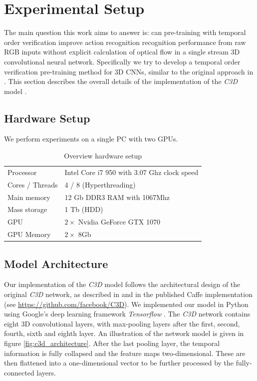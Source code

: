 \section{Experimental Setup}
The main question this work aims to answer is: can pre-training with temporal order verification improve action recognition recognition performance from raw RGB inputs without explicit calculation of optical flow in a single stream 3D convolutional neural network.
Specifically we try to develop a temporal order verification pre-training method for 3D CNNs, similar to the original approach in \cite{misra_shuffle_2016}.
This section describes the overall details of the implementation of the \textit{C3D} model \cite{tran_learning_2015}.


\subsection{Hardware Setup}
\label{sec:hardware}
We perform experiments on a single PC with two GPUs.

\begin{table}[H]
\centering
\begin{tabularx}{\textwidth}{l X}
Processor & Intel Core i7 950 with 3.07 Ghz clock speed \\
Cores / Threads & 4 / 8 (Hyperthreading) \\
Main memory & 12 Gb DDR3 RAM with 1067Mhz\\
Mass storage & 1 Tb (HDD) \\
GPU & $2\times$ Nvidia GeForce GTX 1070 \\
GPU Memory & $2\times$ 8Gb\\
\end{tabularx}
\caption{Overview hardware setup}
\label{tab:hardware-setup}
\end{table}


\subsection{Model Architecture}
Our implementation of the \textit{C3D} model follows the architectural design of the original \textit{C3D} network, as described in \cite{tran_learning_2015} and in the published Caffe implementation (see \mbox{\url{https://github.com/facebook/C3D}}).
We implemented our model in Python using Google's deep learning framework \textit{Tensorflow} \cite{abadi_tensorflow:_2016}.
The \textit{C3D} network contains eight 3D convolutional layers, with max-pooling layers after the first, second, fourth, sixth and eighth layer.
An illustration of the network model is given in figure \ref{fig:c3d_architecture}.
After the last pooling layer, the temporal information is fully collapsed and the feature maps two-dimensional.
These are then flattened into a one-dimensional vector to be further processed by the fully-connected layers.


